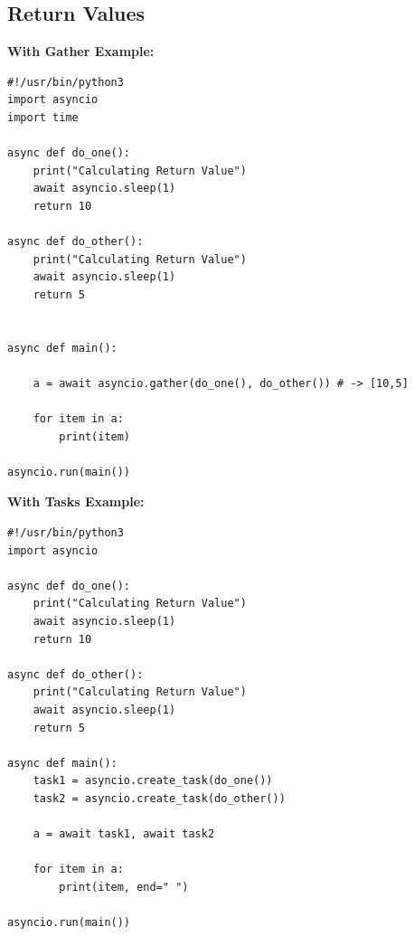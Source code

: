 \documentclass{report}
\begin{document}
    \subsection{Return Values}
    \bigbreak \noindent 
    \begin{mdframed}
      \textbf{With Gather Example: }
      \begin{verbatim}
#!/usr/bin/python3
import asyncio
import time

async def do_one():
    print("Calculating Return Value")
    await asyncio.sleep(1)
    return 10

async def do_other():
    print("Calculating Return Value")
    await asyncio.sleep(1)
    return 5


async def main():

    a = await asyncio.gather(do_one(), do_other()) # -> [10,5]

    for item in a:
        print(item)

asyncio.run(main())
      \end{verbatim}
    \end{mdframed}

    \begin{mdframed}
      \textbf{With Tasks Example: }
      \begin{verbatim}
#!/usr/bin/python3
import asyncio

async def do_one():
    print("Calculating Return Value")
    await asyncio.sleep(1)
    return 10

async def do_other():
    print("Calculating Return Value")
    await asyncio.sleep(1)
    return 5

async def main():
    task1 = asyncio.create_task(do_one())
    task2 = asyncio.create_task(do_other())

    a = await task1, await task2

    for item in a:
        print(item, end=" ")

asyncio.run(main())
      \end{verbatim}
    \end{mdframed}
    \pagebreak \bigbreak \noindent
\end{document}
